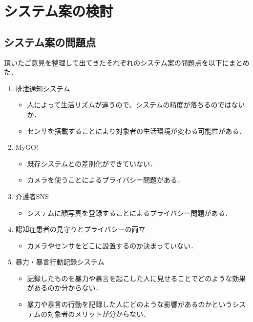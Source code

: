 \documentclass[../report]{subfiles}
\begin{document}
\section{システム案の検討}
\subsection{システム案の問題点}
頂いたご意見を整理して出てきたそれぞれのシステム案の問題点を以下にまとめた．

\begin{enumerate}
    \item[] 排泄通知システム
\begin{itemize}
    \item 人によって生活リズムが違うので、システムの精度が落ちるのではないか．
    \item センサを搭載することにより対象者の生活環境が変わる可能性がある．
\end{itemize}

    \item[] MyGO!
\begin{itemize}
    \item 既存システムとの差別化ができていない．
    \item カメラを使うことによるプライバシー問題がある．
\end{itemize}

    \item[] 介護者SNS
\begin{itemize}
    \item システムに顔写真を登録することによるプライバシー問題がある．
\end{itemize}

    \item[] 認知症患者の見守りとプライバシーの両立
\begin{itemize}
    \item カメラやセンサをどこに設置するのか決まっていない．
\end{itemize}

    \item[] 暴力・暴言行動記録システム
\begin{itemize}
    \item 記録したものを暴力や暴言を起こした人に見せることでどのような効果があるのか分からない．
    \item 暴力や暴言の行動を記録した人にどのような影響があるのかというシステムの対象者のメリットが分からない．
\end{itemize}
\end{enumerate}
\end{document}
